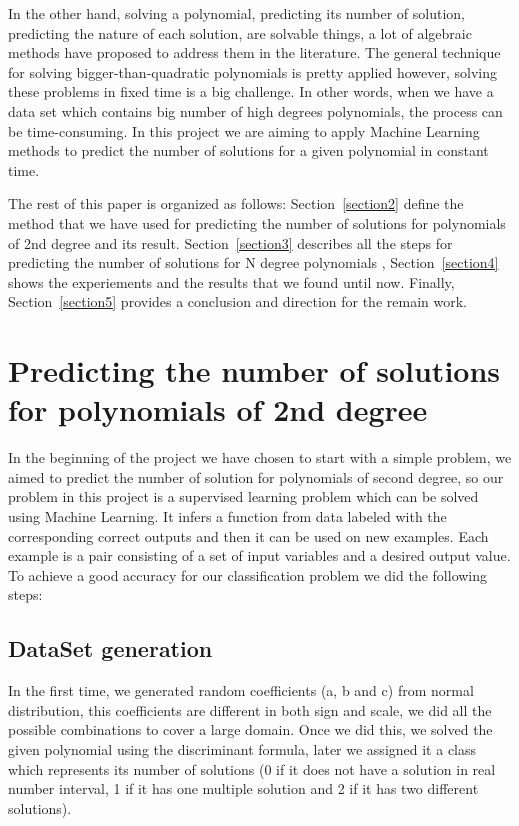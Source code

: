 \documentclass[a4paper,UKenglish]{lipics-v2016}
\begin{document}
 In the other hand, solving a polynomial, predicting its number of solution, predicting the nature of each solution, are solvable things, a lot of algebraic methods have proposed to address them in the literature. The general technique for solving bigger-than-quadratic polynomials is pretty applied however, solving these problems in fixed time is a big challenge. In other words, when we have a data set which contains big number of high degrees polynomials, the process can be time-consuming. In this project we are aiming to apply Machine Learning methods to predict the number of solutions for a given polynomial in constant time.

 The rest of this paper is organized as follows: Section~\ref{section2} define the method that we have used for predicting the number of solutions for polynomials of 2nd degree and its result. Section~\ref{section3} describes all the steps for predicting the number of solutions for N degree polynomials , Section~\ref{section4} shows the experiements and the results that we found until now. Finally, Section~\ref{section5} provides a conclusion and direction for the remain work.


 \section{Predicting the number of solutions for polynomials of 2nd degree \label{section2}}
 In the beginning of the project we have chosen to start with a simple problem, we aimed to predict the number of solution for polynomials of second degree, so our problem in this project is a supervised learning problem which can be solved using Machine Learning. It infers a function from data labeled with the corresponding correct outputs and then it can be used on new examples. Each example is a pair consisting of a set of input variables and a desired output value. To achieve a good accuracy for our classification problem we did the following steps:

 \subsection{DataSet generation\label{data}}

 In the first time, we generated random coefficients (a, b and c) from normal distribution, this  coefficients are different in  both sign and scale, we did all the possible combinations to cover a large domain. Once we did this, we solved the given polynomial using the discriminant formula, later we assigned it a class which represents its number of solutions (0 if it does not have a solution in real number interval, 1 if it has one multiple solution and 2 if it has two different solutions).
\end{document}
